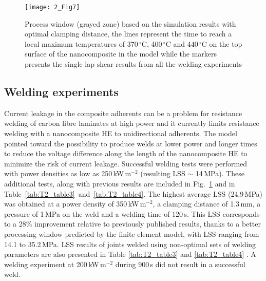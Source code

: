 \begin{figure}[ht]
	\center
	\texttt{[image: 2\_Fig7]}
	\caption{Process window (grayed zone) based on the simulation results with optimal clamping distance, the lines represent the time to reach a local maximum temperatures of 370\,$^{\circ}$C, 400\,$^{\circ}$C and 440\,$^{\circ}$C on the top surface of the nanocomposite in the model while the markers presents the single lap shear results from all the welding experiments \cite{Brassard2019b}}
	\label{fig:2_Fig7}
\end{figure} 

\FloatBarrier
\subsection{Welding experiments}

Current leakage in the composite adherents can be a problem for resistance welding of carbon fibre laminates at high power and it currently limits resistance welding with a nanocomposite HE to unidirectional adherents. 
The model pointed toward the possibility to produce welds at lower power and longer times to reduce the voltage difference along the length of the nanocomposite HE to minimize the risk of current leakage. 
Successful welding tests were performed with power densities as low as \mbox{250\,kW\,m$^{-2}$} (resulting LSS $\sim$ \mbox{14\,MPa}). 
These additional tests, along with previous results are included in \mbox{Fig. \ref{fig:2_Fig7}} and in \mbox{Table \ref{tab:T2_table3} and \ref{tab:T2_table4}}. 
The highest average LSS (\mbox{24.9\,MPa}) was obtained at a power density of \mbox{350\,kW\,m$^{-2}$}, a clamping distance of \mbox{1.3\,mm}, a pressure of \mbox{1\,MPa} on the weld and a welding time of \mbox{120\,s}. 
This LSS corresponds to a 28\% improvement relative to previously published results, thanks to a better processing window predicted by the finite element model, with LSS ranging from 14.1 to \mbox{35.2\,MPa}. 
LSS results of joints welded using non-optimal sets of welding parameters are also presented in Table \ref{tab:T2_table3} and \ref{tab:T2_table4} \cite{Brassard2019b}. 
A welding experiment at \mbox{200\,kW\,m$^{-2}$} during \mbox{900\,s} did not result in a successful weld.  

